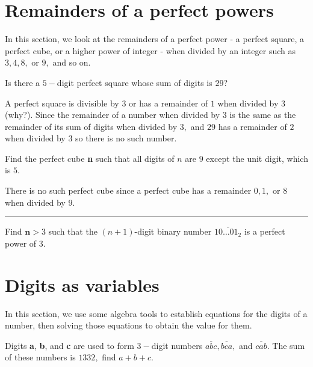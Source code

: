 \documentclass{article}
\begin{document}
\newpage

\section{Remainders of a perfect powers}

In this section, we look at the remainders of a perfect power - a perfect square, a perfect cube, or a higher power of integer
- when divided by an integer such as $3, 4, 8,$ or $9,$ and so on.

\begin{example*}[Four]
    Is there a $5-$digit perfect square whose sum of digits is $29$?
\end{example*}

\begin{soln}
    A perfect square is divisible by $3$ or has a remainder of $1$ when divided by $3$ (why?).
    Since the remainder of a number when divided by $3$ is the same as the remainder of its sum of digits when divided by $3,$
    and $29$ has a remainder of $2$ when divided by $3$ so there is no such number.
\end{soln}

\begin{example*}[Five]
    Find the perfect cube \textbf{n} such that all digits of $n$ are $9$ except the unit digit, which is $5.$
\end{example*}

\begin{soln}
    There is no such perfect cube since a perfect cube has a remainder $0, 1,$ or $8$ when divided by $9.$
\end{soln}

\bigbreak

\noindent\rule{16.5cm}{0.4pt}

\begin{exercise*}[Six]
    \label{exercise:six}
    Find $\textbf{n} > 3$ such that the $(n+1)$-digit binary number $\overline{10\ldots01_2}$ is a perfect power of $3.$
\end{exercise*}

\section{Digits as variables}

In this section, we use some algebra tools to establish equations for the digits of a number,
then solving those equations to obtain the value for them.

\begin{example*}[Seven]
    Digits \textbf{a}, \textbf{b}, and \textbf{c} are used to form $3-$digit numbers $\overline{abc}, \overline{bca},$ and $\overline{cab}.$
    The sum of these numbers is $1332,$ find $a+b+c.$
\end{example*}
\end{document}

